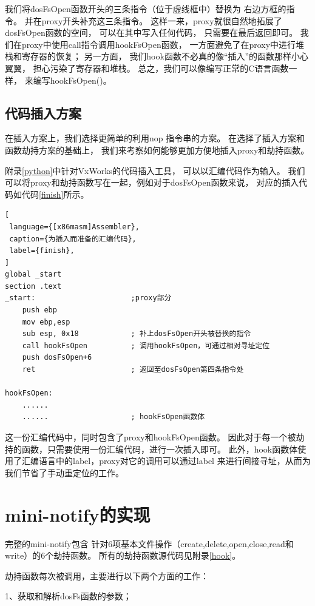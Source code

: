 我们将dosFsOpen函数开头的三条指令（位于虚线框中）替换为
右边方框的指令。
并在proxy开头补充这三条指令。
这样一来，proxy就很自然地拓展了dosFsOpen函数的空间，
可以在其中写入任何代码，
只需要在最后返回即可。
我们在proxy中使用call指令调用hookFsOpen函数，
一方面避免了在proxy中进行堆栈和寄存器的恢复；
另一方面，
我们hook函数不必真的像“插入”的函数那样小心翼翼，
担心污染了寄存器和堆栈。
总之，我们可以像编写正常的C语言函数一样，
来编写hookFsOpen()。

\subsection{代码插入方案}

在插入方案上，我们选择更简单的利用nop
指令串的方案。
在选择了插入方案和函数劫持方案的基础上，
我们来考察如何能够更加方便地插入proxy和劫持函数。

附录\ref{python}中针对VxWorks的代码插入工具，
可以以汇编代码作为输入。
我们可以将proxy和劫持函数写在一起，例如对于dosFsOpen函数来说，
对应的插入代码如代码\ref{finish}所示。

\begin{lstlisting}[
 language={[x86masm]Assembler},
 caption={为插入而准备的汇编代码},
 label={finish},
]
global _start
section .text
_start:                      ;proxy部分
    push ebp
    mov ebp,esp
    sub esp, 0x18            ; 补上dosFsOpen开头被替换的指令
    call hookFsOpen          ; 调用hookFsOpen，可通过相对寻址定位
    push dosFsOpen+6
    ret                      ; 返回至dosFsOpen第四条指令处

hookFsOpen:
    ......
    ......                   ; hookFsOpen函数体
\end{lstlisting}

这一份汇编代码中，同时包含了proxy和hookFsOpen函数。
因此对于每一个被劫持的函数，只需要使用一份汇编代码，进行一次插入即可。
此外，hook函数体使用了汇编语言中的label，proxy对它的调用可以通过label
来进行间接寻址，从而为我们节省了手动重定位的工作。

\section{mini-notify的实现}

完整的mini-notify包含
针对6项基本文件操作（create,delete,open,close,read和write）的6个劫持函数。
所有的劫持函数源代码见附录\ref{hook}。

劫持函数每次被调用，主要进行以下两个方面的工作：

1、获取和解析dosFs函数的参数；

